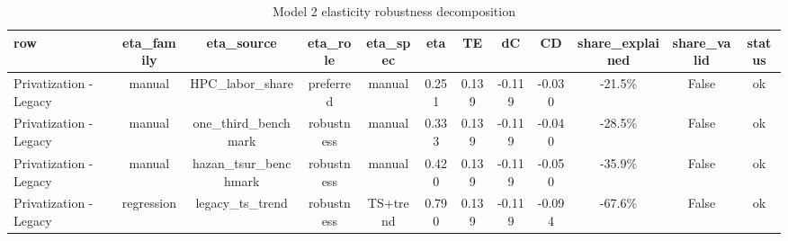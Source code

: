 \begin{table}[!htbp]
  \centering
  \caption{Model 2 elasticity robustness decomposition}
  \label{tab:model2\_elasticity\_robustness}
  \scriptsize
  \begin{tabular}{lccccccccccc}
    \toprule
    row & eta\_family & eta\_source & eta\_role & eta\_spec & eta & TE & dC & CD & share\_explained & share\_valid & status \\
    \midrule
    Privatization - Legacy & manual & HPC\_labor\_share & preferred & manual & 0.251 & 0.139 & -0.119 & -0.030 & -21.5\% & False & ok \\
    Privatization - Legacy & manual & one\_third\_benchmark & robustness & manual & 0.333 & 0.139 & -0.119 & -0.040 & -28.5\% & False & ok \\
    Privatization - Legacy & manual & hazan\_tsur\_benchmark & robustness & manual & 0.420 & 0.139 & -0.119 & -0.050 & -35.9\% & False & ok \\
    Privatization - Legacy & regression & legacy\_ts\_trend & robustness & TS+trend & 0.790 & 0.139 & -0.119 & -0.094 & -67.6\% & False & ok \\
    \bottomrule
  \end{tabular}
\end{table}
